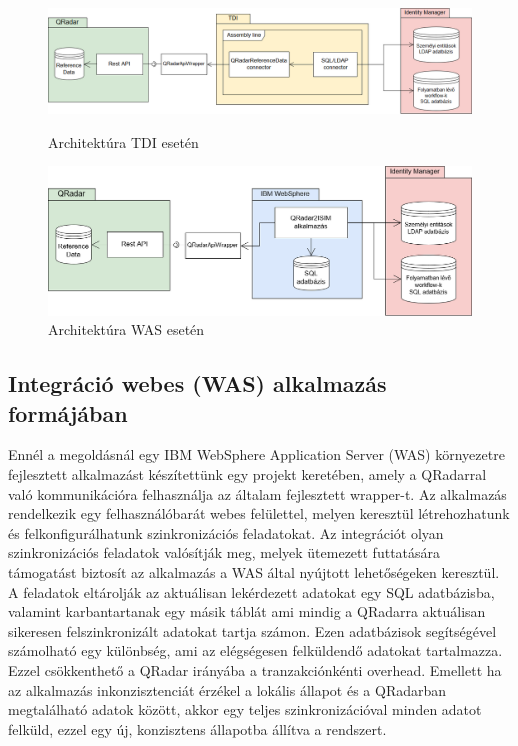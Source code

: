 \begin{figure}[]
	\centering
	\includegraphics[width=1.0\linewidth]{figures/TDI_architecture.png}
	\caption{Architektúra TDI esetén}
	\label{fig:tdi-architecture}
	\includegraphics[width=1.0\linewidth]{figures/WAS_architecture.png}
	\caption{Architektúra WAS esetén}
	\label{fig:wasarchitecture}
\end{figure}


\subsection{Integráció webes (WAS) alkalmazás formájában}

Ennél a megoldásnál egy IBM WebSphere Application Server (WAS) környezetre fejlesztett alkalmazást készítettünk egy projekt keretében, amely a QRadarral való kommunikációra felhasználja az általam fejlesztett wrapper-t. Az alkalmazás rendelkezik egy felhasználóbarát webes felülettel, melyen keresztül létrehozhatunk és felkonfigurálhatunk szinkronizációs feladatokat. Az integrációt olyan szinkronizációs feladatok valósítják meg, melyek ütemezett futtatására támogatást biztosít az alkalmazás a WAS által nyújtott lehetőségeken keresztül. A feladatok eltárolják az aktuálisan lekérdezett adatokat egy SQL adatbázisba, valamint karbantartanak egy másik táblát ami mindig a QRadarra aktuálisan sikeresen felszinkronizált adatokat tartja számon. Ezen adatbázisok segítségével számolható egy különbség, ami az elégségesen felküldendő adatokat tartalmazza. Ezzel csökkenthető a QRadar irányába a tranzakciónkénti overhead. Emellett ha az alkalmazás inkonzisztenciát érzékel a lokális állapot és a QRadarban megtalálható adatok között, akkor egy teljes szinkronizációval minden adatot felküld, ezzel egy új, konzisztens állapotba állítva a rendszert.

